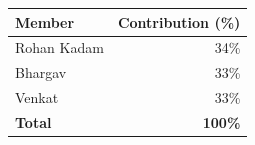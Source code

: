 \documentclass[11pt,a4paper]{article}
\begin{document}
\begin{center}
\begin{tabular}{@{}lr@{}}
\toprule
\textbf{Member} & \textbf{Contribution (\%)} \\
\midrule
Rohan Kadam   & 34\% \\
Bhargav       & 33\% \\
Venkat        & 33\% \\
\midrule
\textbf{Total} & \textbf{100\%} \\
\bottomrule
\end{tabular}
\end{center}



\end{document}
